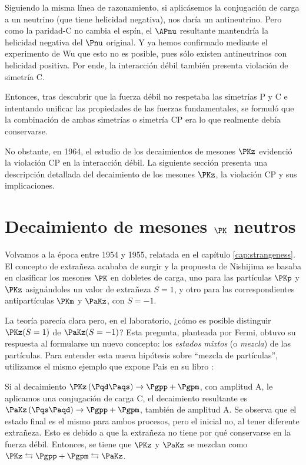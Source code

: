 Siguiendo la misma línea de razonamiento, si aplicásemos la conjugación de carga a un neutrino (que tiene helicidad negativa), nos daría un antineutrino. Pero como la paridad-C no cambia el espín, el $\APnu$ resultante mantendría la helicidad negativa del $\Pnu$ original. Y ya hemos confirmado mediante el experimento de Wu que esto no es posible, pues sólo existen antineutrinos con helicidad positiva. Por ende, la interacción débil también presenta violación de simetría C.

Entonces, tras descubrir que la fuerza débil no respetaba las simetrías P y C e intentando unificar las propiedades de las fuerzas fundamentales, se formuló que la combinación de ambas simetrías o simetría CP era lo que realmente debía conservarse.

No obstante, en 1964, el estudio de los decaimientos de mesones $\PKz$ evidenció la violación CP en la interacción débil. La siguiente sección presenta una descripción detallada del decaimiento de los mesones $\PKz$, la violación CP y sus implicaciones.

\section{Decaimiento de mesones $\PK$ neutros}
\label{sec:neutral_kaon_decay}

Volvamos a la época entre 1954 y 1955, relatada en el capítulo \ref{cap:strangeness}. El concepto de extrañeza acababa de surgir y la propuesta de Nishijima se basaba en clasificar los mesones $\PK$ en dobletes de carga, uno para las partículas $\PKp$ y $\PKz$ asignándoles un valor de extrañeza $S=1$, y otro para las correspondientes antipartículas $\PKm$ y $\PaKz$, con $S=-1$.

La teoría parecía clara pero, en el laboratorio, ¿cómo es posible distinguir $\PKz(S=1)$ de $\PaKz(S=-1)$? Esta pregunta, planteada por Fermi, obtuvo su respuesta al formularse un nuevo concepto: los \textit{estados mixtos} (o \textit{mezcla}) de las partículas. Para entender esta nueva hipótesis sobre ``mezcla de partículas'', utilizamos el mismo ejemplo que expone Pais en su libro \cite{Pais}:

Si al decaimiento $\PKz \left(\Pqd\Paqs\right) \rightarrow \Pgpp + \Pgpm$, con amplitud A, le aplicamos una conjugación de carga C, el decaimiento resultante es $\PaKz \left(\Pqs\Paqd\right) \rightarrow \Pgpp + \Pgpm$, también de amplitud A. Se observa que el estado final es el mismo para ambos procesos, pero el inicial no, al tener diferente extrañeza. Esto es debido a que la extrañeza no tiene por qué conservarse en la fuerza débil. Entonces, se tiene que $\PKz$ y $\PaKz$ se mezclan como $\PKz \leftrightarrows \Pgpp + \Pgpm \leftrightarrows \PaKz$.

